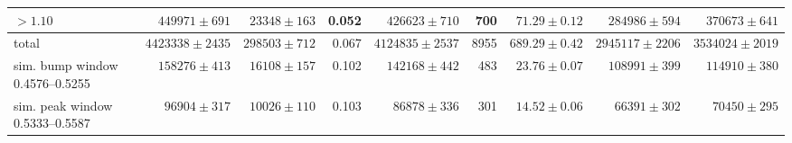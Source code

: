 \begin{table}[H]
{\begin{tabular}{lrrrrrrrr}
$>1.10$ & $449971\pm691$ & $23348\pm163$ & 0.052 & $426623\pm710$ & 700 & $71.29\pm0.12$ & $284986\pm594$ & $370673\pm641$ \\
\midrule
total & $4423338\pm2435$ & $298503\pm712$ & 0.067 & $4124835\pm2537$ & 8955 & $689.29\pm0.42$ & $2945117\pm2206$ & $3534024\pm2019$ \\
\midrule
sim. bump window 0.4576--0.5255 & $158276\pm413$ & $16108\pm157$ & 0.102 & $142168\pm442$ & 483 & $23.76\pm0.07$ & $108991\pm399$ & $114910\pm380$ \\
sim. peak window 0.5333--0.5587 & $96904\pm317$ & $10026\pm110$ & 0.103 & $86878\pm336$ & 301 & $14.52\pm0.06$ & $66391\pm302$ & $70450\pm295$ \\
\bottomrule
\end{tabular}}
\end{table}
